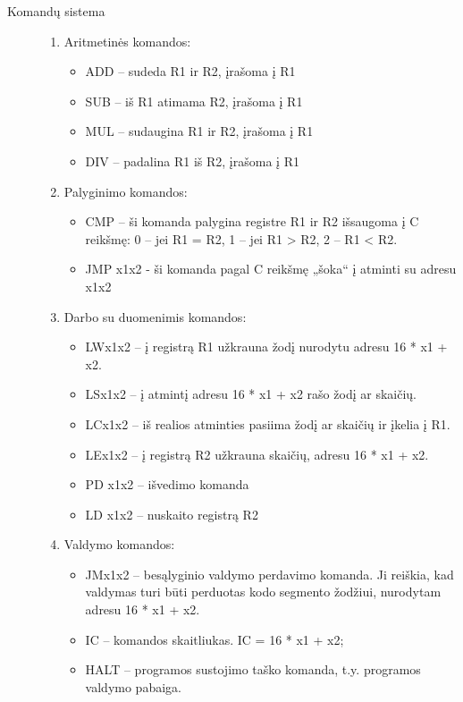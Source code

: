 \begin{description}
\item[Komandų sistema] \leavevmode 
\begin{enumerate}
\item Aritmetinės komandos: \leavevmode 
\begin{itemize}
\item ADD – sudeda R1 ir R2, įrašoma į R1
\item SUB – iš R1 atimama R2, įrašoma į R1
\item MUL – sudaugina R1 ir R2, įrašoma į R1
\item DIV – padalina R1 iš R2, įrašoma į R1
\end{itemize}
\item Palyginimo komandos:
\begin{itemize}
\item CMP – ši komanda palygina registre R1 ir R2 išsaugoma į C reikšmę: 0 – jei R1 = R2,  1 – jei R1 > R2, 2 –  R1 < R2.
\item JMP x1x2 - ši komanda pagal C reikšmę „šoka“ į atminti su adresu x1x2
\end{itemize}
\item  Darbo su duomenimis komandos:
\begin{itemize}
\item LWx1x2 – į registrą R1 užkrauna žodį nurodytu adresu 16 * x1 + x2.
\item LSx1x2 – į atmintį  adresu 16 * x1 + x2 rašo žodį ar skaičių.
\item LCx1x2 – iš realios atminties pasiima žodį ar skaičių ir įkelia į R1.
\item LEx1x2 – į registrą R2 užkrauna skaičių, adresu 16 * x1 + x2.
\item PD x1x2 – išvedimo komanda
\item LD x1x2 – nuskaito registrą R2
\end{itemize}
\item Valdymo komandos:
\begin{itemize}
\item JMx1x2 – besąlyginio valdymo perdavimo komanda. Ji reiškia, kad valdymas turi būti perduotas kodo segmento žodžiui, nurodytam adresu 16 * x1 + x2.
\item IC – komandos skaitliukas. IC = 16 * x1 + x2;
\item HALT – programos sustojimo taško komanda, t.y. programos valdymo pabaiga.
\end{itemize}
\end{enumerate}
\end{description}   
   

